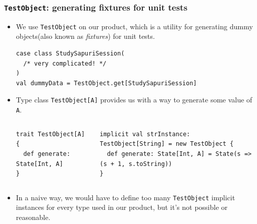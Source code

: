 \begin{frame}[fragile]
  \frametitle{\lstinline|TestObject|: generating fixtures for unit tests}

  \begin{itemize}
    \item<+-> We use \lstinline|TestObject| on our product,
    which is a utility for generating dummy objects(also known as \emph{fixtures}) for unit tests.
\begin{lstlisting}[style=scala]
case class StudySapuriSession(
  /* very complicated! */
)
val dummyData = TestObject.get[StudySapuriSession]
\end{lstlisting}

    \item<+-> Type class \lstinline|TestObject[A]| provides us with a way to generate some value of \lstinline|A|.
    \begin{columns}
      \begin{column}{0.32\textwidth}
\begin{lstlisting}[style=scala]
trait TestObject[A] {
  def generate: State[Int, A]
}
\end{lstlisting}
      \end{column}
      \begin{column}{0.68\textwidth}
\begin{lstlisting}[style=scala]
implicit val strInstance: TestObject[String] = new TestObject {
  def generate: State[Int, A] = State(s => (s + 1, s.toString))
}
\end{lstlisting}
      \end{column}
    \end{columns}

    \item<+-> In a naive way, we would have to define too many \lstinline|TestObject| implicit instances for
    every type used in our product, but it's not possible or reasonable.
  \end{itemize}

\end{frame}

